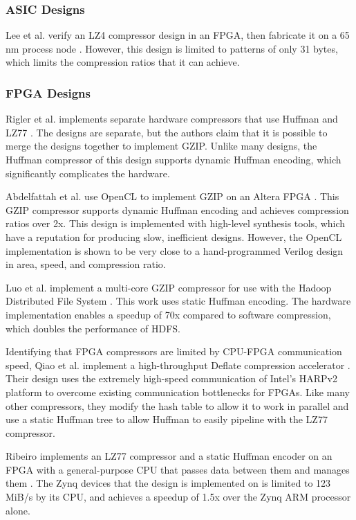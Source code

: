 \documentclass[doublespace,nopageskip]{VTthesis}
\begin{document}
\subsubsection{ASIC Designs}\label{sss:asic_designs}
Lee et al. verify an LZ4 compressor design in an FPGA, then fabricate it on a 65 nm process node \cite{hardwarelz4}. However, this design is limited to patterns of only 31 bytes, which limits the compression ratios that it can achieve.

\subsubsection{FPGA Designs}\label{sss:fpga_designs}

Rigler et al. implements separate hardware compressors that use Huffman and LZ77 \cite{fpgahuffmanlz77}. The designs are separate, but the authors claim that it is possible to merge the designs together to implement GZIP. Unlike many designs, the Huffman compressor of this design supports dynamic Huffman encoding, which significantly complicates the hardware.

Abdelfattah et al. use OpenCL to implement GZIP on an Altera FPGA \cite{gziponachip}. This GZIP compressor supports dynamic Huffman encoding and achieves compression ratios over 2x. This design is implemented with high-level synthesis tools, which have a reputation for producing slow, inefficient designs. However, the OpenCL implementation is shown to be very close to a hand-programmed Verilog design in area, speed, and compression ratio.

Luo et al. implement a multi-core GZIP compressor for use with the Hadoop Distributed File System \cite{hdfsgzip}. This work uses static Huffman encoding. The hardware implementation enables a speedup of 70x compared to software compression, which doubles the performance of HDFS.

Identifying that FPGA compressors are limited by CPU-FPGA communication speed, Qiao et al. implement a high-throughput Deflate compression accelerator \cite{fpgadeflate}. Their design uses the extremely high-speed communication of Intel's HARPv2 platform to overcome existing communication bottlenecks for FPGAs. Like many other compressors, they modify the hash table to allow it to work in parallel and use a static Huffman tree to allow Huffman to easily pipeline with the LZ77 compressor.

Ribeiro implements an LZ77 compressor and a static Huffman encoder on an FPGA with a general-purpose CPU that passes data between them and manages them \cite{ribeiro}. The Zynq devices that the design is implemented on is limited to 123 MiB/s by its CPU, and achieves a speedup of 1.5x over the Zynq ARM processor alone.
\end{document}
